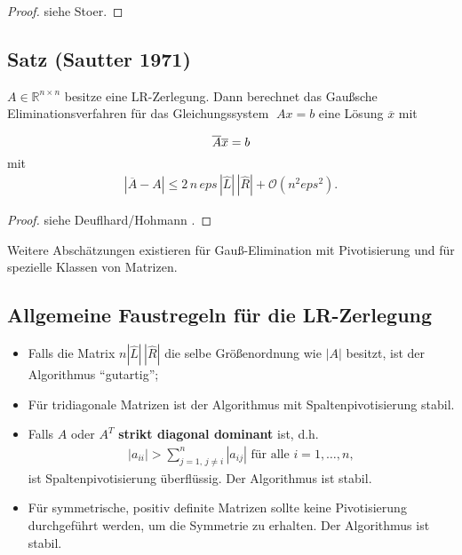 \documentclass[ngerman,fontsize=11pt, paper=a4, parskip=half, titlepage=true, toc=bib]{scrbook}
\newcommand{\R}{\mathds{R}}
\begin{document}
  \begin{proof}
  	siehe Stoer\cite{stoerbulirsch}.
  \end{proof}
  
  
  \subsection{Satz (Sautter 1971)}
  $ A \in \R^{n\times n}$ besitze eine LR-Zerlegung.  Dann berechnet das
  Gaußsche Eliminationsverfahren für das Gleichungssystem
  $\;  A  x =  b$ eine Lösung $\overline{ x}$ mit 
  \begin{gather*} \overline{ A} \overline{ x}  =   b \vspace*{-2ex} \end{gather*}
  mit
  \begin{gather*} 
	  | \overline{ A} - A |  \leq  2 \, n \, eps \,
	  |\hat{L}| \, | \hat{R}| + \mathcal{O}( n^2 eps^2).
  \end{gather*}
  
    \begin{proof}
    	siehe Deuflhard/Hohmann \cite{deuflhardhohmann}.
    \end{proof}
    
    Weitere Abschätzungen existieren für Gauß-Elimination mit 
    Pivotisierung und für spezielle Klassen von Matrizen.
    
    \subsection{Allgemeine Faustregeln für die LR-Zerlegung}
    \begin{itemize}
    	\item Falls die Matrix $n | \hat{ L} | \,  |\hat{ R}|$ die
    	selbe Größenordnung wie $| A|$ besitzt, ist der
    	Algorithmus \enquote{gutartig};
    	\item Für tridiagonale Matrizen  ist der Algorithmus mit
    	Spaltenpivotisierung stabil.
    	\item Falls $ A$ oder $ A^T$  \textbf{strikt diagonal
    		dominant} ist, d.h. 
    		\begin{gather*}
    			| a_{ii} | > \sum\limits_{j=1 ,\, j \not = i}^{n} | a_{ij}| 
    			\mbox{ für alle } i = 1, \ldots, n,
    		\end{gather*}
    		ist Spaltenpivotisierung überflüssig. Der Algorithmus ist stabil.
    	\item Für symmetrische, positiv definite Matrizen sollte keine Pivotisierung
    		durchgeführt werden, um die Symmetrie zu erhalten.
    		Der Algorithmus ist stabil.
    \end{itemize}
    
\end{document}
